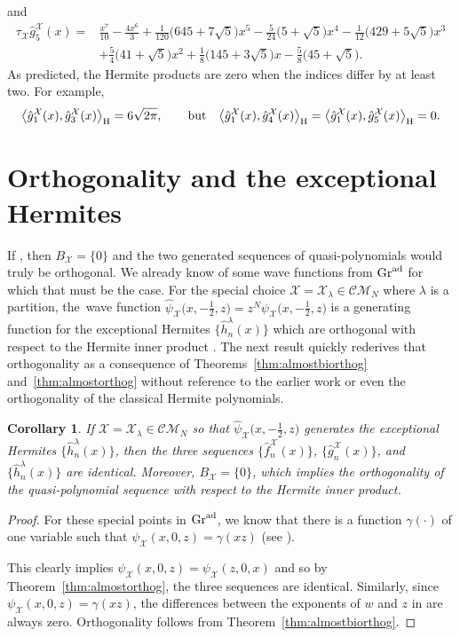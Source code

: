 \documentclass[10pt,a4paper]{amsart}
\numberwithin{equation}{section}
\newtheorem{Corollary}[Theorem]{Corollary}
\theoremstyle{definition}
\def\X{\mathcal{X}}
\def\CM{\mathcal{C\!M}}
\def\ff{\hat f}
\def\gg{\hat g}
\begin{document}
and
\begin{align*}
\tau_{\X} \gg_5^{\X}(x)={}&
\frac{x^7}{10}-\frac{4
 x^6}{3}+\frac{1}{120}
 \bigl(645+7 \sqrt{5}\bigr)
 x^5-\frac{5}{24}
 \bigl(5+\sqrt{5}\bigr)
 x^4-\frac{1}{12} \bigl(429+5
 \sqrt{5}\bigr) x^3
 \\
 &+\frac{5}{4}
 \bigl(41+\sqrt{5}\bigr)
 x^2+\frac{1}{8} \bigl(145+3
 \sqrt{5}\bigr) x-\frac{5}{8}
 \bigl(45+\sqrt{5}\bigr).
\end{align*}
As predicted, the Hermite products are zero when the indices differ by
at least two. For example,
 \[
 \big\langle \gg_1^{\X}(x),\gg_3^{\X}(x)\big\rangle_{\rm H}
 =6\sqrt{2\pi},
\qquad\text{but}\quad
 \big\langle \gg_1^{\X}(x),\gg_4^{\X}(x) \big\rangle_{\rm H}
= \big\langle \gg_1^{\X}(x),\gg_5^{\X}(x)\big\rangle_{\rm H}
=0.
 \]


\section{Orthogonality and the exceptional Hermites}

If \smash{$\hat{\hat\psi}_{\X}(x,0,z)=\hat{\hat\psi}_{\X}(xz,0,1)$}, then
$B_{\X}=\{0\}$ and the two generated sequences of quasi-poly\-nomials would truly be orthogonal.
We already know of some wave functions from ${\rm Gr}^{\rm ad}$ for which that
must be the case.
For the special choice
$\X=\X_{\lambda}\in\CM_N$ where $\lambda$ is a partition, the~wave
function $\hat\psi_{\X}\bigl(x,-\tfrac{1}{2},z\bigr)=z^N\psi_{\X}\bigl(x,-\tfrac{1}{2},z\bigr)$ is a generating function for the
exceptional Hermites $\big\{\hat h_n^\lambda(x)\big\}$ which are orthogonal
with respect to the Hermite inner product
\cite{KasMil,PThesis,PalusoKasman}. The next result quickly
rederives that
orthogonality as a consequence of Theorems~\ref{thm:almostbiorthog}
and~\ref{thm:almostorthog} without reference to the earlier
work or even the orthogonality of the classical Hermite polynomials.

\begin{Corollary}\label{cor:proddep}
If $\X=\X_{\lambda}\in\CM_N$ so that $\hat\psi_{\X}\bigl(x,-\tfrac{1}{2},z\bigr)$ generates the
exceptional Hermites $\big\{\hat h_n^{\lambda}(x)\big\}$, then
the three sequences $\big\{\ff_n^{\X}(x)\big\}$, $\big\{\gg_n^{\X}(x)\big\}$, and $\big\{\hat
h_n^{\lambda}(x)\big\}$ are identical.
Moreover, $B_{\X}=\{0\}$, which implies the orthogonality of the
quasi-polynomial sequence with respect to the Hermite inner product.
\end{Corollary}
\begin{proof}
 For these special points in ${\rm Gr}^{\rm ad}$, we know that there is a
 function $\gamma(\cdot)$ of one variable such that
$
 \psi_{\X}(x,0,z)=\gamma(xz)
$
 (see \cite[Section~10, Example~2]{WilsonBisp}).

This clearly implies
 $\psi_{\X}(x,0,z)=\psi_{\X}(z,0,x)$ and so by
 Theorem~\ref{thm:almostorthog}, the three sequences are identical.
 Similarly, since $\psi_{\X}(x,0,z)=\gamma(xz)$,
 the differences between
 the exponents of $w$ and $z$ in \smash{$\hat{\hat\psi}_{\X}(w,0,z)$} are
 always zero. Orthogonality follows from Theorem~\ref{thm:almostbiorthog}.
\end{proof}
\end{document}
